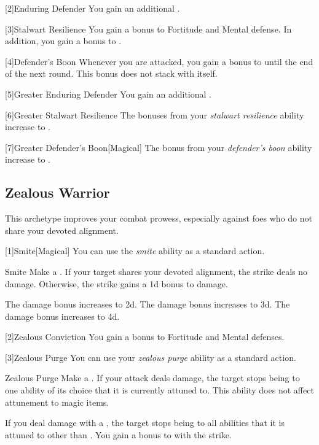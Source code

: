         [2]{Enduring Defender}
        You gain an additional .

        [3]{Stalwart Resilience}
        You gain a  bonus to Fortitude and Mental defense.
        In addition, you gain a  bonus to .

        [4]{Defender's Boon}
        Whenever you are attacked, you gain a  bonus to  until the end of the next round.
        This bonus does not stack with itself.

        [5]{Greater Enduring Defender}
        You gain an additional .

        [6]{Greater Stalwart Resilience} The bonuses from your \textit{stalwart resilience} ability increase to .

        [7]{Greater Defender's Boon}[Magical]
        The bonus from your \textit{defender's boon} ability increase to .

    \subsection{Zealous Warrior}
        This archetype improves your combat prowess, especially against foes who do not share your devoted alignment.

        [1]{Smite}[Magical] You can use the \textit{smite} ability as a standard action.
        \begin{freeability}{Smite}
            Make a .
            If your target shares your devoted alignment, the strike deals no damage.
            Otherwise, the strike gains a \plus1d bonus to damage.

            \rankline
             The damage bonus increases to \plus2d.
             The damage bonus increases to \plus3d.
             The damage bonus increases to \plus4d.
        \end{freeability}

        [2]{Zealous Conviction} You gain a  bonus to Fortitude and Mental defenses.

        [3]{Zealous Purge} You can use your \textit{zealous purge} ability as a standard action.
        \begin{freeability}{Zealous Purge}
            Make a .
            If your attack deals damage, the target stops being  to one ability of its choice that it is currently attuned to.
            This ability does not affect attunement to magic items.

            \rankline
             If you deal damage with a , the target stops being  to all abilities that it is attuned to other than .
             You gain a  bonus to  with the strike.
        \end{freeability}

